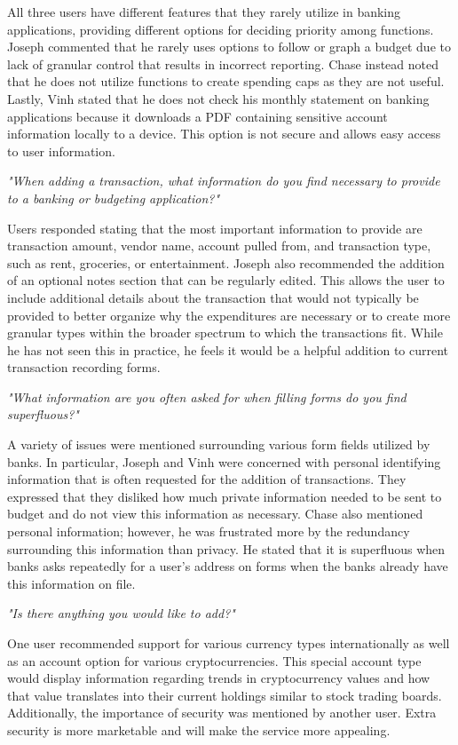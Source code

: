     \bigskip\noindent All three users have different features that they rarely utilize in banking applications, providing different options for deciding priority among functions. Joseph commented that he rarely uses options to follow or graph a budget due to lack of granular control that results in incorrect reporting. Chase instead noted that he does not utilize functions to create spending caps as they are not useful. Lastly, Vinh stated that he does not check his monthly statement on banking applications because it downloads a PDF containing sensitive account information locally to a device. This option is not secure and allows easy access to user information.

    \bigskip\noindent\textit{"When adding a transaction, what information do you find necessary to provide to a banking or budgeting application?"}

    \bigskip\noindent Users responded stating that the most important information to provide are transaction amount, vendor name, account pulled from, and transaction type, such as rent, groceries, or entertainment. Joseph also recommended the addition of an optional notes section that can be regularly edited. This allows the user to include additional details about the transaction that would not typically be provided to better organize why the expenditures are necessary or to create more granular types within the broader spectrum to which the transactions fit. While he has not seen this in practice, he feels it would be a helpful addition to current transaction recording forms.

    \bigskip\noindent\textit{"What information are you often asked for when filling forms do you find superfluous?"}
    
    \bigskip\noindent A variety of issues were mentioned surrounding various form fields utilized by banks. In particular, Joseph and Vinh were concerned with personal identifying information that is often requested for the addition of transactions. They expressed that they disliked how much private information needed to be sent to budget and do not view this information as necessary. Chase also mentioned personal information; however, he was frustrated more by the redundancy surrounding this information than privacy. He stated that it is superfluous when banks asks repeatedly for a user’s address on forms when the banks already have this information on file.

    \bigskip\noindent\textit{"Is there anything you would like to add?"}

    \bigskip \noindent One user recommended support for various currency types internationally as well as an account option for various cryptocurrencies. This special account type would display information regarding trends in cryptocurrency values and how that value translates into their current holdings similar to stock trading boards. Additionally, the importance of security was mentioned by another user. Extra security is more marketable and will make the service more appealing.

